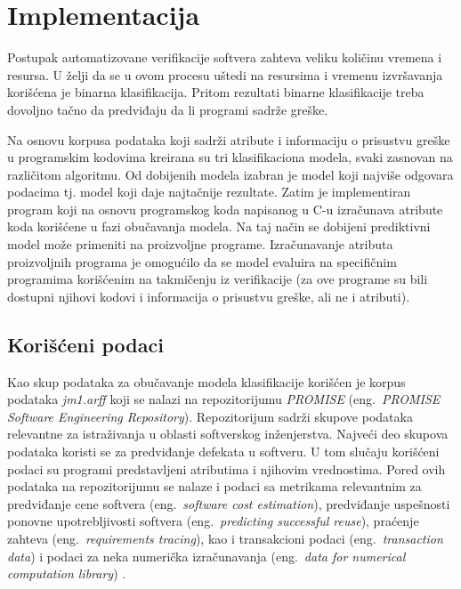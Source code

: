 \documentclass[12pt,oneside]{memoir}
\begin{document}
\chapter{Implementacija}
\label{chp:implementacija}

Postupak automatizovane verifikacije softvera zahteva veliku količinu vremena i resursa. 
U želji da se u ovom procesu uštedi na resursima i vremenu izvršavanja korišćena je binarna klasifikacija. Pritom rezultati binarne klasifikacije treba dovoljno tačno da predviđaju da li programi sadrže greške. 

Na osnovu korpusa podataka koji sadrži atribute i informaciju o prisustvu greške u programskim kodovima kreirana su tri klasifikaciona modela, svaki zasnovan na različitom algoritmu. Od dobijenih modela izabran je model koji najviše odgovara podacima tj. model koji daje najtačnije rezultate. Zatim je implementiran program koji na osnovu programskog koda napisanog u C-u izračunava atribute koda korišćene u fazi obučavanja modela. Na taj način se dobijeni prediktivni model može primeniti na proizvoljne programe. Izračunavanje atributa proizvoljnih programa je omogućilo da se model evaluira na specifičnim programima korišćenim na takmičenju iz verifikacije (za ove programe su bili dostupni njihovi kodovi i informacija o prisustvu greške, ali ne i atributi).

\section{Korišćeni podaci}
\label{sec:kor_podaci}

Kao skup podataka za obučavanje modela klasifikacije korišćen je korpus podataka \textit{jm1.arff} koji se nalazi na repozitorijumu \textit{PROMISE} (eng.~\textit{PROMISE Software Engineering Repository}). Repozitorijum sadrži skupove podataka relevantne za istraživanja u oblasti softverskog inženjerstva. Najveći deo skupova podataka koristi se za predviđanje defekata u softveru. U tom slučaju korišćeni podaci su programi predstavljeni atributima i njihovim vrednostima. Pored ovih podataka na repozitorijumu se nalaze i podaci sa metrikama relevantnim za predviđanje cene softvera (eng.~\textit{software cost estimation}), predviđanje uspešnosti ponovne upotrebljivosti softvera (eng.~\textit{predicting successful reuse}), praćenje zahteva (eng.~\textit{requirements tracing}), kao i transakcioni podaci (eng.~\textit{transaction data}) i podaci za neka numerička izračunavanja (eng.~\textit{data for numerical computation library}) \cite{promise}.
\end{document}
